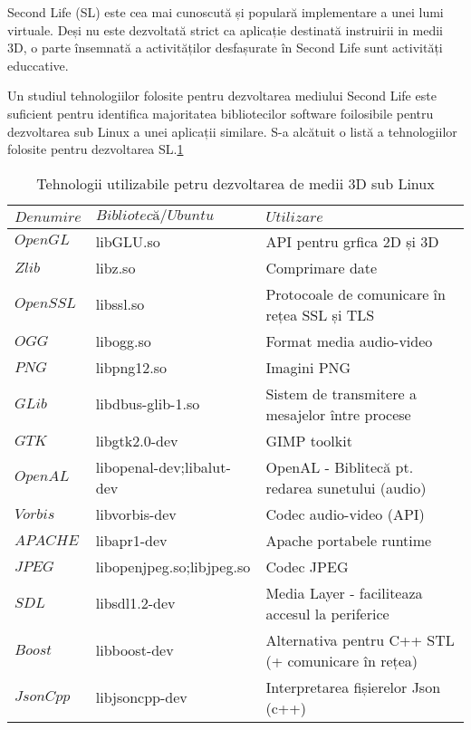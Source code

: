 \par Second Life (SL) este cea mai cunoscută și populară implementare a unei lumi virtuale. Deși nu este dezvoltată strict ca aplicație destinată instruirii in medii 3D, o parte însemnată a activităților desfașurate în Second Life sunt activități educcative.
\par Un studiul tehnologiilor folosite pentru dezvoltarea mediului Second Life este suficient pentru  identifica majoritatea bibliotecilor software foilosibile pentru dezvoltarea sub Linux a unei aplicații similare. S-a alcătuit o listă a tehnologiilor folosite pentru dezvoltarea SL.\ref{tab:SL_tech}
\begin{table}
      \begin{center}
            \begin{tabular}{|l|l|l|}
                \hline 
                \cline{2-3}
                $Denumire $ & $Bibliotecă/Ubuntu$ & $Utilizare$  \\ 
        	\hline
                $OpenGL$  	&  libGLU.so     	&  API pentru grfica 2D și 3D  \\
                $Zlib$   	&  libz.so     		&  Comprimare date  \\
                
                $OpenSSL$   &  libssl.so    	&  Protocoale de comunicare în rețea SSL și TLS  \\
                $OGG$   	&  libogg.so      	&  Format media audio-video  \\
                $PNG$   	&  libpng12.so      &  Imagini PNG  \\
                $GLib$   	&  libdbus-glib-1.so     &  Sistem de transmitere a mesajelor între procese  \\
                $GTK$   	&  libgtk2.0-dev 	&  GIMP toolkit  \\
                $OpenAL$   	&  libopenal-dev;libalut-dev	&  OpenAL - Biblitecă pt. redarea sunetului (audio) \\
                $Vorbis$   	&  libvorbis-dev 	&  Codec audio-video (API) \\
                $APACHE$   	&  libapr1-dev  	&  Apache portabele runtime  \\
                $JPEG$   	&  libopenjpeg.so;libjpeg.so &  Codec JPEG  \\
                $SDL$   	&  libsdl1.2-dev	&  Media Layer - faciliteaza accesul la periferice  \\
                $Boost$   	&  libboost-dev     &  Alternativa pentru C++ STL (+ comunicare în rețea) \\
                $JsonCpp$  	&  libjsoncpp-dev 	&  Interpretarea fișierelor Json (c++)  \\
            \hline
	    \end{tabular}
        \end{center}
    \caption{Tehnologii utilizabile petru dezvoltarea de medii 3D sub Linux}
    \label{tab:SL_tech}
\end{table}

